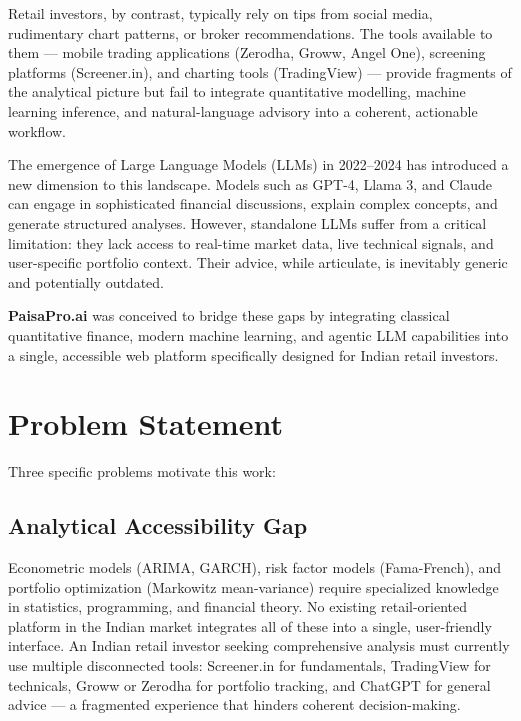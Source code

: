 \documentclass[12pt, a4paper, oneside]{report}
\newcommand{\projectname}{PaisaPro.ai}
\begin{document}
Retail investors, by contrast, typically rely on tips from social media, rudimentary chart patterns, or broker recommendations. The tools available to them --- mobile trading applications (Zerodha, Groww, Angel One), screening platforms (Screener.in), and charting tools (TradingView) --- provide fragments of the analytical picture but fail to integrate quantitative modelling, machine learning inference, and natural-language advisory into a coherent, actionable workflow.

The emergence of Large Language Models (LLMs) in 2022--2024 has introduced a new dimension to this landscape. Models such as GPT-4, Llama 3, and Claude can engage in sophisticated financial discussions, explain complex concepts, and generate structured analyses. However, standalone LLMs suffer from a critical limitation: they lack access to real-time market data, live technical signals, and user-specific portfolio context. Their advice, while articulate, is inevitably generic and potentially outdated.

\textbf{\projectname{}} was conceived to bridge these gaps by integrating classical quantitative finance, modern machine learning, and agentic LLM capabilities into a single, accessible web platform specifically designed for Indian retail investors.

\section{Problem Statement}
\label{sec:problem_statement}

Three specific problems motivate this work:

\subsection{Analytical Accessibility Gap}

Econometric models (ARIMA, GARCH), risk factor models (Fama-French), and portfolio optimization (Markowitz mean-variance) require specialized knowledge in statistics, programming, and financial theory. No existing retail-oriented platform in the Indian market integrates all of these into a single, user-friendly interface. An Indian retail investor seeking comprehensive analysis must currently use multiple disconnected tools: Screener.in for fundamentals, TradingView for technicals, Groww or Zerodha for portfolio tracking, and ChatGPT for general advice --- a fragmented experience that hinders coherent decision-making.
\end{document}
